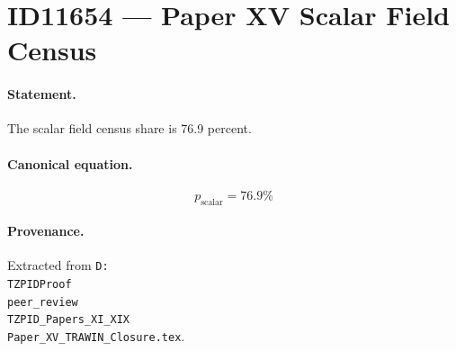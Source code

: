 \section*{ID11654 --- Paper XV Scalar Field Census}

\paragraph{Statement.}
The scalar field census share is 76.9 percent.

\paragraph{Canonical equation.}
\[
p_{\mathrm{scalar}}=76.9\%
\]

\paragraph{Provenance.}
Extracted from \texttt{D:\\TZPIDProof\\peer\_review\\TZPID\_Papers\_XI\_XIX\\Paper\_XV\_TRAWIN\_Closure.tex}.
